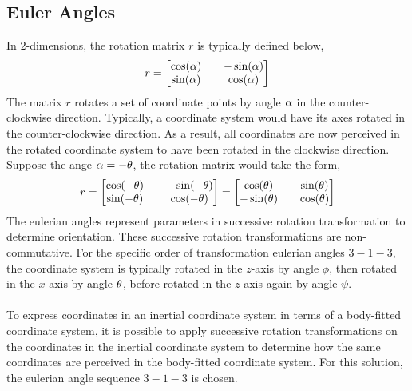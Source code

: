 \documentclass[class=report, 12pt, crop=false]{standalone}
\begin{document}
\begin{center}
\section{Euler Angles}
\begin{comment}
\end{comment}
In $2$-dimensions, the rotation matrix $r$ is typically defined below,
$$r = \begin{bmatrix}
\cos(\alpha) && -\sin(\alpha) \\ 
\sin(\alpha) && \cos(\alpha)
\end{bmatrix}$$
The matrix $r$ rotates a set of coordinate points by angle $\alpha$ in the counter-clockwise direction. Typically, a coordinate system would have its axes rotated in the counter-clockwise direction. As a result, all coordinates are now perceived in the rotated coordinate system to have been rotated in the clockwise direction. Suppose the ange $\alpha = -\theta$, the rotation matrix would take the form,
$$r = \begin{bmatrix}
\cos(-\theta) && -\sin(-\theta) \\ 
\sin(-\theta) && \cos(-\theta)
\end{bmatrix} = \begin{bmatrix}
\cos(\theta) && \sin(\theta) \\ 
-\sin(\theta) && \cos(\theta)
\end{bmatrix}$$
The eulerian angles represent parameters in successive rotation transformation to determine orientation. These successive rotation transformations are non-commutative. For the specific order of transformation eulerian angles $3-1-3$, the coordinate system is typically rotated in the $z$-axis by angle $\phi$, then rotated in the $x$-axis by angle $\theta$, before rotated in the $z$-axis again by angle $\psi$. 
\\~\\To express coordinates in an inertial coordinate system in terms of a body-fitted coordinate system, it is possible to apply successive rotation transformations on the coordinates in the inertial coordinate system to determine how the same coordinates are perceived in the body-fitted coordinate system. For this solution, the eulerian angle sequence $3-1-3$ is chosen. 


\end{center}
\end{document}

